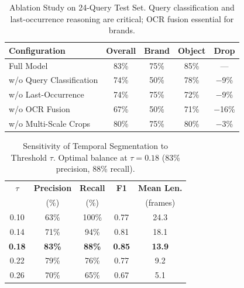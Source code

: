 \begin{table}[t]
\centering
\caption{Ablation Study on 24-Query Test Set. Query classification
  and last-occurrence reasoning are critical; OCR fusion essential for brands.}
\label{tab:ablation}
\begin{tabular}{lcccc}
\toprule
\textbf{Configuration} & \textbf{Overall} & \textbf{Brand} & \textbf{Object} & \textbf{Drop} \\
\midrule
Full Model & 83\% & 75\% & 85\% & — \\
\midrule
w/o Query Classification  & 74\% & 50\% & 78\% & −9\% \\
w/o Last-Occurrence       & 74\% & 75\% & 72\% & −9\% \\
w/o OCR Fusion            & 67\% & 50\% & 71\% & −16\% \\
w/o Multi-Scale Crops     & 80\% & 75\% & 80\% & −3\% \\
\bottomrule
\end{tabular}
\end{table}

\begin{table}[t]
\centering
\caption{Sensitivity of Temporal Segmentation to Threshold $\tau$.
  Optimal balance at $\tau = 0.18$ (83\% precision, 88\% recall).}
\label{tab:threshold}
\begin{tabular}{ccccc}
\toprule
$\tau$ & \textbf{Precision} & \textbf{Recall} & \textbf{F1} & \textbf{Mean Len.} \\
       & (\%)               & (\%)            &     & (frames) \\
\midrule
0.10 &  63\% & 100\% & 0.77 & 24.3 \\
0.14 &  71\% & 94\%  & 0.81 & 18.1 \\
\textbf{0.18} & \textbf{83\%} & \textbf{88\%} & \textbf{0.85} & \textbf{13.9} \\
0.22 &  79\% & 76\%  & 0.77 & 9.2 \\
0.26 &  70\% & 65\%  & 0.67 & 5.1 \\
\bottomrule
\end{tabular}
\end{table}

